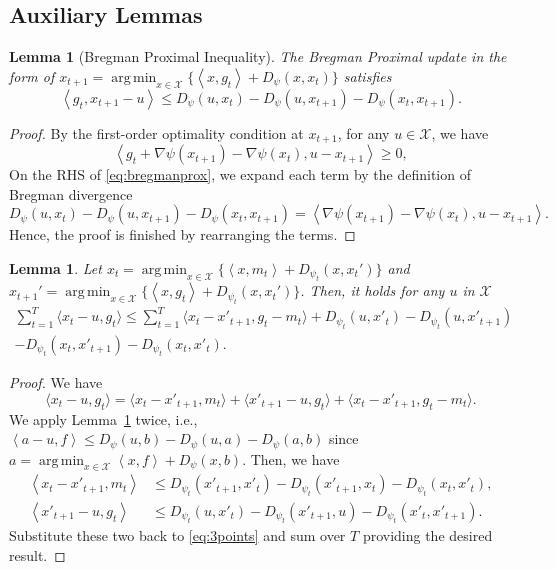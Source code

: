 \documentclass{article}
\theoremstyle{plain}
\newtheorem{lemma}[theorem]{Lemma}
\theoremstyle{definition}
\theoremstyle{remark}
\DeclareMathOperator*{\argmin}{arg\,min}
\newcommand{\cX}{\mathcal{X}}
\newcommand{\inner}[2]{\left\langle #1, #2 \right\rangle}
\begin{document}
\subsection{Auxiliary Lemmas}
\begin{lemma}[Bregman Proximal Inequality]
\label{lem:3points}
The Bregman Proximal update in the form of $x_{t+1}=\argmin_{x\in\cX}\{\inner{x}{g_t}+D_{\psi}(x,x_t)\}$ satisfies
\begin{equation}\label{eq:bregmanprox}
\inner{g_t}{x_{t+1}-u}\leq D_{\psi}(u,x_t)-D_{\psi}(u,x_{t+1})-D_{\psi}(x_t,x_{t+1}).
\end{equation}
\end{lemma}
\begin{proof}
By the first-order optimality condition at $x_{t+1}$, for any $u\in\cX$, we have
\begin{equation*}
\inner{g_t+\nabla\psi(x_{t+1})-\nabla\psi(x_t)}{u-x_{t+1}}\geq 0,
\end{equation*}
On the RHS of \eqref{eq:bregmanprox}, we expand each term by the definition of Bregman divergence
\begin{equation*}
D_{\psi}(u,x_t)-D_{\psi}(u,x_{t+1})-D_{\psi}(x_t,x_{t+1})=\inner{\nabla\psi(x_{t+1})-\nabla\psi(x_{t})}{u-x_{t+1}}.
\end{equation*}
Hence, the proof is finished by rearranging the terms.
\end{proof}



\begin{lemma}\label{lem:regretexpand}
Let $x_t = \argmin_{x\in\cX}\{\inner{x}{m_t} + D_{\psi_{t}}(x,x_t')\}$ and $x_{t+1}' = \argmin_{x\in\cX}\{\inner{x}{g_t} + D_{\psi_t}(x, x_t')\}$. Then, it holds for any $u$ in $\cX$
\begin{align*}
\sum_{t=1}^T\langle x_t-u,g_t\rangle\leq \sum_{t=1}^T \langle x_t-x'_{t+1},g_t-m_t\rangle+D_{\psi_t}(u,x'_t)-D_{\psi_t}(u,x'_{t+1})
\\-D_{\psi_t}(x_t,x'_{t+1})-D_{\psi_t}(x_t,x'_{t}).
\end{align*}
\end{lemma}
\begin{proof}
We have 
\begin{equation}\label{eq:3points}
\langle x_t-u,g_t\rangle = \langle x_t-x'_{t+1},m_t\rangle+\langle x'_{t+1}-u,g_t\rangle+\langle x_t-x'_{t+1},g_t-m_t\rangle.
\end{equation}
We apply Lemma~\ref{lem:3points}  twice, i.e., $\inner{a-u}{f}\leq D_{\psi}(u,b)-D_{\psi}(u,a)-D_{\psi}(a,b)$ since $a=\argmin_{x\in\cX}\inner{x}{f}+D_{\psi}(x,b)$. Then, we have
\begin{align*}
\inner{x_t-x'_{t+1}}{m_t}&\leq D_{\psi_t}(x'_{t+1},x'_t)-D_{\psi_t}(x'_{t+1},x_t)-D_{\psi_t}(x_{t},x'_t),\\
\inner{x'_{t+1}-u}{g_t}&\leq D_{\psi_t}(u,x'_t)-D_{\psi_t}(x'_{t+1},u)-D_{\psi_t}(x'_{t},x'_{t+1}).
\end{align*}
Substitute these two back to \eqref{eq:3points} and sum over $T$ providing the desired result.
\end{proof}
\end{document}
